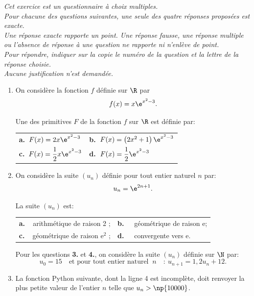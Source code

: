 \medskip

\emph{Cet exercice est un questionnaire à choix multiples.\\
Pour chacune des questions suivantes, une seule des quatre réponses proposées est exacte.\\ Une réponse exacte rapporte un point. Une réponse fausse, une réponse multiple ou l'absence de réponse à une question ne rapporte ni n'enlève de point.\\
Pour répondre, indiquer sur la copie le numéro de la question et la lettre de la réponse choisie.\\
Aucune justification n'est demandée.}

\medskip

\begin{enumerate}
\item On considère la fonction $f$ définie sur $\R$ par 
\[f(x) = x \e^{x^2 - 3}.\]

Une des primitives $F$ de la fonction $f$ sur $\R$ est définie par:
\begin{center}
\begin{tabularx}{\linewidth}{*{2}{X}}
\textbf{a.~}$F(x) = 2x\e^{x^2 - 3}$&\textbf{b.~}$F(x) = \left(2x^2 + 1\right)\e^{x^2 - 3}$\\
\textbf{c.~}$F(x) = \dfrac12 x\e^{x^2 - 3}$&\textbf{d.~}$F(x) = \dfrac12 \e^{x^2 - 3}$
\end{tabularx}
\end{center}

\item On considère la suite $\left(u_n\right)$ définie pour tout entier naturel $n$ par: \[u_n = \e^{2n+1}.\]

La suite $\left(u_n\right)$ est:

\begin{center}
\begin{tabularx}{\linewidth}{*{2}{X}}
\textbf{a.~~}arithmétique de raison 2 ; &\textbf{b.~~} géométrique de raison e;\\
\textbf{c.~~}géométrique de raison e$^2$ ; &\textbf{d.~~} convergente vers e. 
\end{tabularx}
\end{center}

Pour les questions \textbf{3.} et \textbf{4.}, on considère la suite $\left(u_n\right)$ définie sur $\N$ par:
\[u_0 = 15 \quad \text{et pour tout entier naturel }\: n \quad :\: u_{n+1} = 1,2u_n + 12.\]

\item La fonction Python suivante, dont la ligne 4 est incomplète, doit renvoyer la plus petite valeur de l'entier $n$ telle que $u_n > \np{10000}$.


\end{enumerate}
